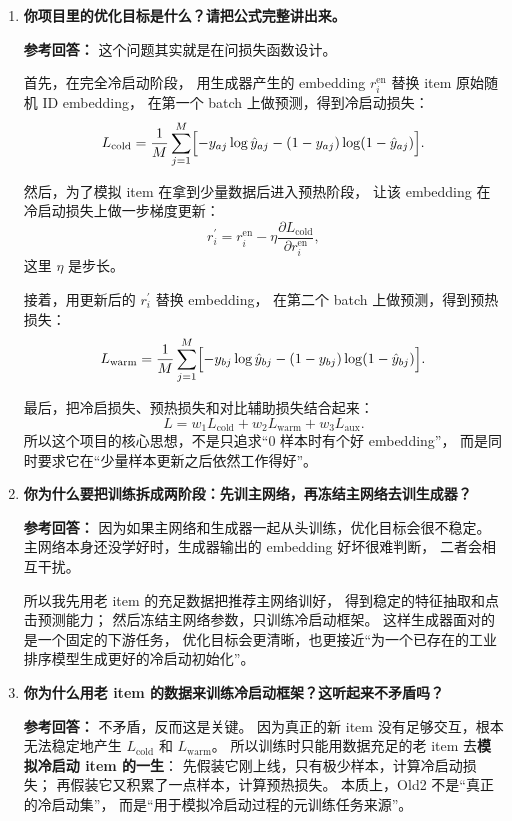 \documentclass[11pt,a4paper]{ctexart}
\begin{document}
\begin{enumerate}[leftmargin=*, label=\textbf{Q\arabic*.}]
然后把生成器输出与去噪因子相加，得到最终初始表示：
\[
r_i^{\text{en}} = r_i + d_i.
\]
平均池化的好处是能减弱离群样本的影响，
因此面试时我会把它解释为：\textbf{用有限但相对稳定的用户侧统计信息，对冷启动 item 的初始表示做一次鲁棒校正。}

\item \textbf{你项目里的优化目标是什么？请把公式完整讲出来。}

\textbf{参考回答：}
这个问题其实就是在问损失函数设计。

首先，在完全冷启动阶段，
用生成器产生的 embedding $r_i^{\text{en}}$ 替换 item 原始随机 ID embedding，
在第一个 batch 上做预测，得到冷启动损失：
\[
L_{\text{cold}}
=
\frac{1}{M}
\sum_{j=1}^{M}
\Bigl[
-y_{aj}\log \hat y_{aj}
-
(1-y_{aj})\log(1-\hat y_{aj})
\Bigr].
\]

然后，为了模拟 item 在拿到少量数据后进入预热阶段，
让该 embedding 在冷启动损失上做一步梯度更新：
\[
r_i^{\prime}
=
r_i^{\text{en}}
-
\eta \frac{\partial L_{\text{cold}}}{\partial r_i^{\text{en}}},
\]
这里 $\eta$ 是步长。

接着，用更新后的 $r_i^{\prime}$ 替换 embedding，
在第二个 batch 上做预测，得到预热损失：
\[
L_{\text{warm}}
=
\frac{1}{M}
\sum_{j=1}^{M}
\Bigl[
-y_{bj}\log \hat y_{bj}
-
(1-y_{bj})\log(1-\hat y_{bj})
\Bigr].
\]

最后，把冷启损失、预热损失和对比辅助损失结合起来：
\[
L
=
w_1 L_{\text{cold}}
+
w_2 L_{\text{warm}}
+
w_3 L_{\text{aux}}.
\]
所以这个项目的核心思想，不是只追求“0 样本时有个好 embedding”，
而是同时要求它在“少量样本更新之后依然工作得好”。

\item \textbf{你为什么要把训练拆成两阶段：先训主网络，再冻结主网络去训生成器？}

\textbf{参考回答：}
因为如果主网络和生成器一起从头训练，优化目标会很不稳定。
主网络本身还没学好时，生成器输出的 embedding 好坏很难判断，
二者会相互干扰。

所以我先用老 item 的充足数据把推荐主网络训好，
得到稳定的特征抽取和点击预测能力；
然后冻结主网络参数，只训练冷启动框架。
这样生成器面对的是一个固定的下游任务，
优化目标会更清晰，也更接近“为一个已存在的工业排序模型生成更好的冷启动初始化”。

\item \textbf{你为什么用老 item 的数据来训练冷启动框架？这听起来不矛盾吗？}

\textbf{参考回答：}
不矛盾，反而这是关键。
因为真正的新 item 没有足够交互，根本无法稳定地产生
$L_{\text{cold}}$ 和 $L_{\text{warm}}$。
所以训练时只能用数据充足的老 item 去\textbf{模拟冷启动 item 的一生}：
先假装它刚上线，只有极少样本，计算冷启动损失；
再假装它又积累了一点样本，计算预热损失。
本质上，Old2 不是“真正的冷启动集”，
而是“用于模拟冷启动过程的元训练任务来源”。


\end{enumerate}
\end{document}
